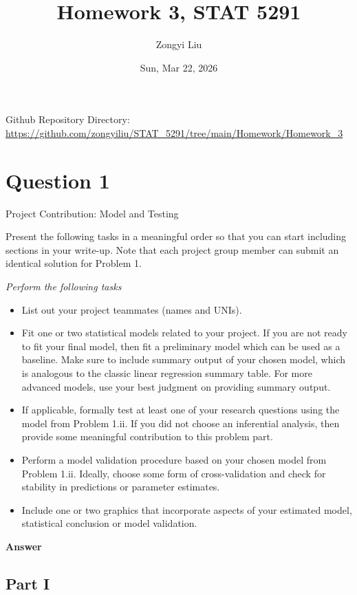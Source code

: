 \documentclass[letterpaper]{article}
\title{Homework 3, STAT 5291}
\author{Zongyi Liu}
\date{Sun, Mar 22, 2026}
\begin{document}
		\maketitle
		
		{Github Repository Directory}: \url{https://github.com/zongyiliu/STAT_5291/tree/main/Homework/Homework_3}
		
		\tableofcontents
		
		\clearpage
		\section{Question 1}
		
		{\color{deepred} Project Contribution: Model and Testing}
		
		Present the following tasks in a meaningful order so that you can start including sections in your write-up. Note that each project group member can submit an identical solution for Problem 1.
		
		\emph{Perform the following tasks}
		\begin{itemize}
			\item[(i)] List out your project teammates (names and UNIs).
			\item[(ii)] Fit one or two statistical models related to your project. If you are not ready to fit your final model, then fit a preliminary model which can be used as a baseline. Make sure to include summary output of your chosen model, which is analogous to the classic linear regression summary table. For more advanced models, use your best judgment on providing summary output.
			\item[(iii)] If applicable, formally test at least one of your research questions using the model from Problem 1.ii. If you did not choose an inferential analysis, then provide some meaningful contribution to this problem part.
			\item[(iv)] Perform a model validation procedure based on your chosen model from Problem 1.ii. Ideally, choose some form of cross-validation and check for stability in predictions or parameter estimates.
			\item[(v)] Include one or two graphics that incorporate aspects of your estimated model, statistical conclusion or model validation.
		\end{itemize}
		
		\textbf{Answer}
		
		\subsection{Part I}
		
\end{document}
